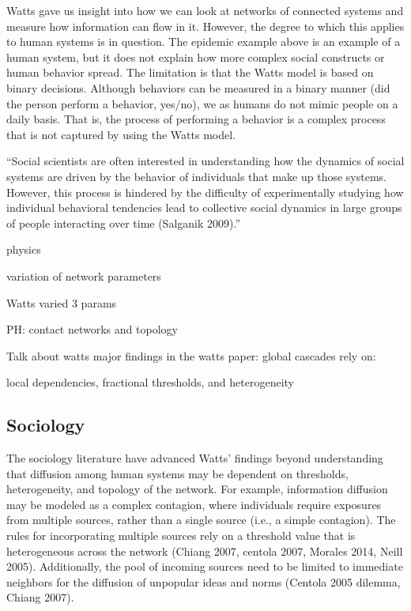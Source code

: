 \documentclass[10pt,letterpaper]{article}
\begin{document}
Watts gave us insight into how we can look at networks of connected systems and
measure how information can flow in it.
However, the degree to which this applies to human systems is in question.
The epidemic example above is an example of a human system,
but it does not explain how more complex social constructs or human behavior spread.
The limitation is that the Watts model is based on binary decisions.
Although behaviors can be measured in a binary manner (did the person perform a behavior, yes/no),
we as humans do not mimic people on a daily basis.
That is, the process of performing a behavior is a complex process
that is not captured by using the Watts model.

\hrulefill

``Social scientists are often interested in understanding how the dynamics
of social systems are driven by the behavior of individuals that make up
those systems. However, this process is hindered by the difficulty of
experimentally studying how individual behavioral tendencies lead to
collective social dynamics in large groups of people interacting over
time (Salganik 2009).''

physics

variation of network parameters

Watts varied 3 params

PH: contact networks and topology

Talk about watts major findings in the watts paper:
global cascades rely on:

local dependencies, fractional thresholds, and heterogeneity

\subsection{Sociology}

The sociology literature have advanced Watts' findings beyond understanding that diffusion among human systems may be dependent on thresholds, heterogeneity, and topology of the network.
For example, information diffusion may be modeled as a complex contagion,
where individuals require exposures from multiple sources,
rather than a single source (i.e., a simple contagion).
The rules for incorporating multiple sources rely on a threshold value
that is heterogeneous across the network (Chiang 2007, centola 2007, Morales 2014, Neill 2005).
Additionally, the pool of incoming sources need to be limited to immediate neighbors for
the diffusion of unpopular ideas and norms (Centola 2005 dilemma, Chiang 2007).
\end{document}
